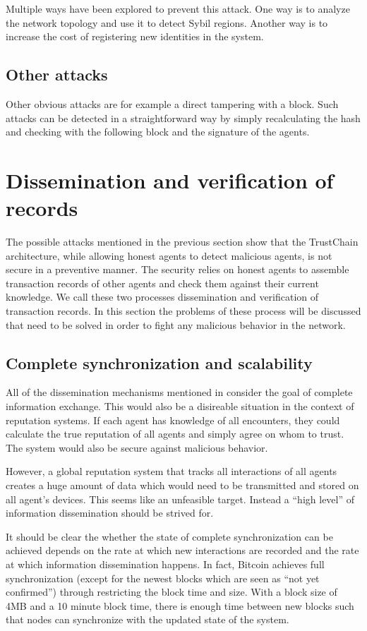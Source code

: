Multiple ways have been explored to prevent this attack. One way is to analyze the network topology
and use it to detect Sybil regions. Another way is to increase the cost of registering new identities
in the system. 

\subsection{Other attacks}
Other obvious attacks are for example a direct tampering with a block. Such attacks can be 
detected in a straightforward way by simply recalculating the hash and checking with the following 
block and the signature of the agents.

\section{Dissemination and verification of records}
The possible attacks mentioned in the previous section show that the TrustChain architecture, while
allowing honest agents to detect malicious agents, is not secure in a preventive manner. The security
relies on honest agents to assemble transaction records of other agents and check them against their
current knowledge. We call these two processes dissemination and verification of transaction records.
In this section the problems of these process will be discussed that need to be solved in order to 
fight any malicious behavior in the network.

\subsection{Complete synchronization and scalability}
All of the dissemination mechanisms mentioned in \cite{hedetniemi1988survey} consider the goal of
complete information exchange. This would also be a disireable situation in the context of reputation
systems. If each agent has knowledge of all encounters, they could calculate the true reputation of
all agents and simply agree on whom to trust. The system would also be secure against malicious 
behavior. 

However, a global reputation system that tracks all interactions of all agents creates a huge amount
of data which would need to be transmitted and stored on all agent's devices. This seems like an
unfeasible target. Instead a ``high level'' of information dissemination should be strived for.

It should be clear the whether the state of complete synchronization can be achieved depends on the
rate at which new interactions are recorded and the rate at which information dissemination happens.
In fact, Bitcoin achieves full synchronization (except for the newest blocks which are seen as ``not
yet confirmed'') through restricting the block time and size. With a block size of 4MB and a 10 minute
block time, there is enough time between new blocks such that nodes can synchronize with the updated
state of the system.

